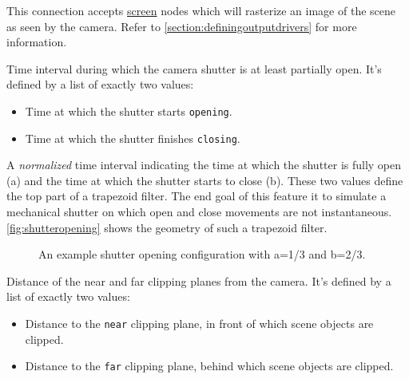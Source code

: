 \documentclass[oneside,ebook]{memoir}
\newcommand{\paramlistitemTN}[2]{\item[#2\textcolor{lightgray}{\dotfill}#1]}
\begin{document}
\begin{paramlist}
\paramlistitemTN{<connection>}{screens}
This connection accepts \hyperref[section:screennode]{screen} nodes which will rasterize an image of the scene as seen by the camera.
Refer to \autoref{section:definingoutputdrivers} for more information.
\paramlistitemTN{double}{shutterrange}
Time interval during which the camera shutter is at least partially open. It's defined by a list of exactly two values:
\begin{itemize}
\item Time at which the shutter starts \lstinline|opening|.
\item Time at which the shutter finishes \lstinline|closing|.
\end{itemize}
\paramlistitemTN{double}{shutteropening}
A \emph{normalized} time interval indicating the time at which the shutter is fully open (a) and the time at which the shutter starts to close (b).
These two values define the top part of a trapezoid filter.
The end goal of this feature it to simulate a mechanical shutter on which open and close movements are not instantaneous.
\autoref{fig:shutteropening} shows the geometry of such a trapezoid filter.
\begin{figure}[H]
\centering
{}

\caption{An example shutter opening configuration with a=1/3 and b=2/3.}
\label{fig:shutteropening}
\end{figure}

\paramlistitemTN{double}{clippingrange}
Distance of the near and far clipping planes from the camera.  It's defined by a list of exactly two values:
\begin{itemize}
\item Distance to the \lstinline|near| clipping plane, in front of which scene objects are clipped.
\item Distance to the \lstinline|far| clipping plane, behind which scene objects are clipped.
\end{itemize}
\end{paramlist}
\end{document}
